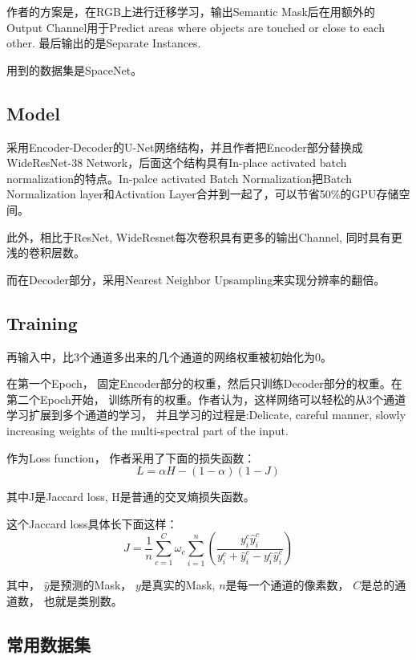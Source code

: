 作者的方案是，在RGB上进行迁移学习，输出Semantic Mask后在用额外的Output Channel用于Predict areas where objects are touched or close to each other. 最后输出的是Separate Instances.

用到的数据集是SpaceNet。

\subsection{Model}

采用Encoder-Decoder的U-Net网络结构，并且作者把Encoder部分替换成 WideResNet-38 Network，后面这个结构具有In-place activated batch normalization的特点。In-palce activated Batch Normalization把Batch Normalization layer和Activation Layer合并到一起了，可以节省50\%的GPU存储空间。

此外，相比于ResNet, WideResnet每次卷积具有更多的输出Channel, 同时具有更浅的卷积层数。

而在Decoder部分，采用Nearest Neighbor Upsampling来实现分辨率的翻倍。

\subsection{Training}

再输入中，比3个通道多出来的几个通道的网络权重被初始化为0。

在第一个Epoch， 固定Encoder部分的权重，然后只训练Decoder部分的权重。在第二个Epoch开始， 训练所有的权重。作者认为，这样网络可以轻松的从3个通道学习扩展到多个通道的学习， 并且学习的过程是:Delicate, careful manner, slowly increasing weights of the multi-spectral part of the input.

作为Loss function， 作者采用了下面的损失函数：
\begin{displaymath}
L = \alpha H - (1 - \alpha)(1 - J)
\end{displaymath}

其中J是Jaccard loss, H是普通的交叉熵损失函数。

这个Jaccard loss具体长下面这样：
\begin{displaymath}
J = \frac{1}{n}\sum_{c=1}^{C}\omega_c \sum_{i = 1}^{n}\left( \frac{y_i^c \hat{y}_i^c}{y_i^c + \hat{y}_i^c - y_i^c \hat{y}_i^c} \right)
\end{displaymath}

其中， $\hat{y}$是预测的Mask， $y$是真实的Mask, $n$是每一个通道的像素数， $C$是总的通道数， 也就是类别数。






\subsection{常用数据集}

